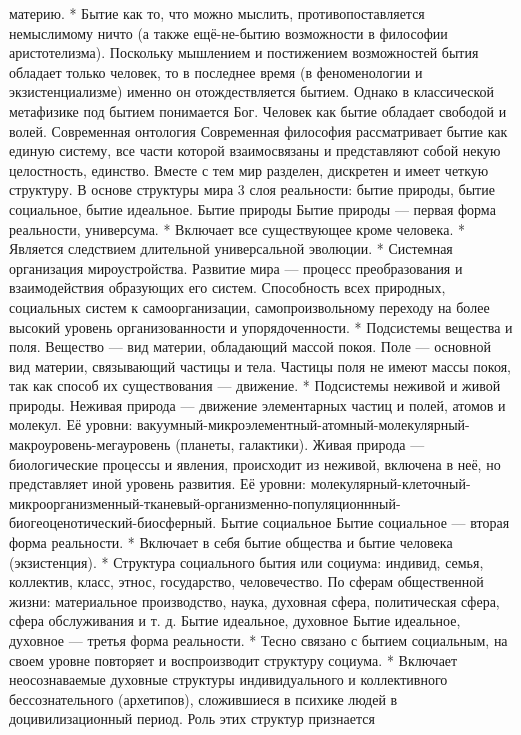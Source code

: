\documentclass[12pt]{article}
\begin{document}
материю.
 * Бытие как то, что можно мыслить, противопоставляется немыслимому ничто (а также ещё-не-бытию
возможности в философии аристотелизма). Поскольку мышлением и постижением возможностей бытия
обладает только человек, то в последнее время (в феноменологии и экзистенциализме) именно он
отождествляется бытием. Однако в классической метафизике под бытием понимается Бог. Человек как бытие
обладает свободой и волей.
Современная онтология
Современная философия рассматривает бытие как единую систему, все части которой взаимосвязаны и
представляют собой некую целостность, единство. Вместе с тем мир разделен, дискретен и имеет четкую
структуру. В основе структуры мира 3 слоя реальности: бытие природы, бытие социальное, бытие идеальное.
Бытие природы
Бытие природы — первая форма реальности, универсума.
* Включает все существующее кроме человека.
* Является следствием длительной универсальной эволюции.
 * Системная организация мироустройства. Развитие мира — процесс преобразования и взаимодействия
образующих его систем. Способность всех природных, социальных систем к самоорганизации,
самопроизвольному переходу на более высокий уровень организованности и упорядоченности.
* Подсистемы вещества и поля. Вещество — вид материи, обладающий массой покоя. Поле — основной вид
материи, связывающий частицы и тела. Частицы поля не имеют массы покоя, так как способ их существования
— движение.
 * Подсистемы неживой и живой природы. Неживая природа — движение элементарных частиц и полей,
атомов и молекул. Её уровни: вакуумный-микроэлементный-атомный-молекулярный-макроуровень-мегауровень
(планеты, галактики). Живая природа — биологические процессы и явления, происходит из неживой, включена
в неё, но представляет иной уровень развития. Её уровни: молекулярный-клеточный-микроорганизменный-тканевый-организменно-популяционнный-биогеоценотический-биосферный.
Бытие социальное
Бытие социальное — вторая форма реальности.
* Включает в себя бытие общества и бытие человека (экзистенция).
 * Структура социального бытия или социума: индивид, семья, коллектив, класс, этнос, государство,
человечество. По сферам общественной жизни: материальное производство, наука, духовная сфера,
политическая сфера, сфера обслуживания и т. д.
Бытие идеальное, духовное
Бытие идеальное, духовное — третья форма реальности.
* Тесно связано с бытием социальным, на своем уровне повторяет и воспроизводит структуру социума.
 * Включает неосознаваемые духовные структуры индивидуального и коллективного бессознательного
(архетипов), сложившиеся в психике людей в доцивилизационный период. Роль этих структур признается
\end{document}

